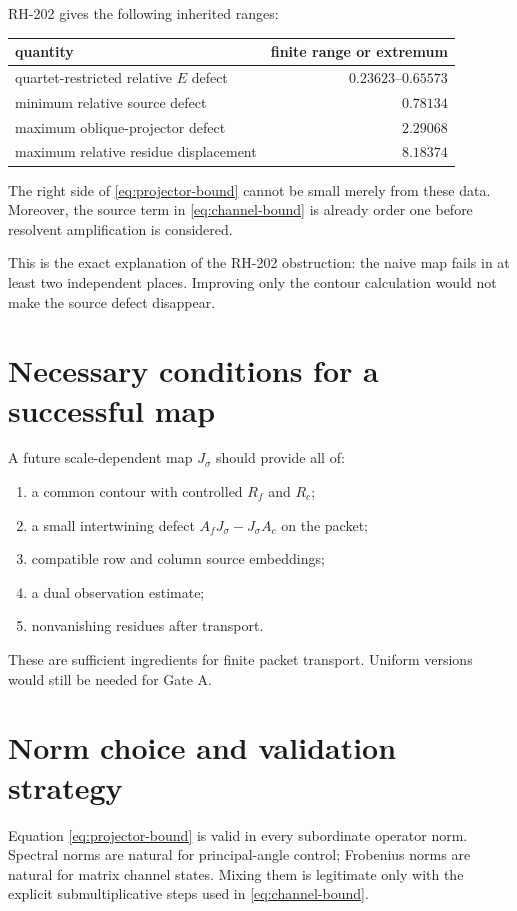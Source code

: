 \documentclass[12pt]{article}
\theoremstyle{remark}\newtheorem{remark}[theorem]{Remark}
\begin{document}
RH-202 gives the following inherited ranges:
\begin{center}
\begin{tabular}{lr}
\toprule
quantity & finite range or extremum\\
\midrule
quartet-restricted relative $E$ defect & $0.23623$--$0.65573$\\
minimum relative source defect & $0.78134$\\
maximum oblique-projector defect & $2.29068$\\
maximum relative residue displacement & $8.18374$\\
\bottomrule
\end{tabular}
\end{center}
The right side of \eqref{eq:projector-bound} cannot be small merely from
these data.  Moreover, the source term in \eqref{eq:channel-bound} is already
order one before resolvent amplification is considered.

This is the exact explanation of the RH-202 obstruction: the naive map fails
in at least two independent places.  Improving only the contour calculation
would not make the source defect disappear.

\section{Necessary conditions for a successful map}

A future scale-dependent map $J_\sigma$ should provide all of:
\begin{enumerate}[leftmargin=2em]
\item a common contour with controlled $R_f$ and $R_c$;
\item a small intertwining defect $A_fJ_\sigma-J_\sigma A_c$ on the packet;
\item compatible row and column source embeddings;
\item a dual observation estimate;
\item nonvanishing residues after transport.
\end{enumerate}
These are sufficient ingredients for finite packet transport.  Uniform
versions would still be needed for Gate A.

\section{Norm choice and validation strategy}

Equation \eqref{eq:projector-bound} is valid in every subordinate operator
norm.  Spectral norms are natural for principal-angle control; Frobenius norms
are natural for matrix channel states.  Mixing them is legitimate only with
the explicit submultiplicative steps used in \eqref{eq:channel-bound}.
\end{document}
